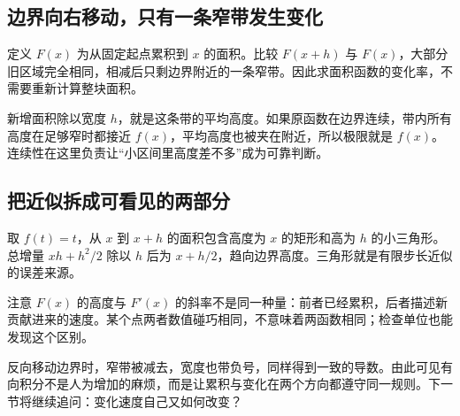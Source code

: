 \subsection*{边界向右移动，只有一条窄带发生变化}
定义 $F(x)$ 为从固定起点累积到 $x$ 的面积。比较 $F(x+h)$ 与 $F(x)$，大部分旧区域完全相同，相减后只剩边界附近的一条窄带。因此求面积函数的变化率，不需要重新计算整块面积。

新增面积除以宽度 $h$，就是这条带的平均高度。如果原函数在边界连续，带内所有高度在足够窄时都接近 $f(x)$，平均高度也被夹在附近，所以极限就是 $f(x)$。连续性在这里负责让“小区间里高度差不多”成为可靠判断。

\subsection*{把近似拆成可看见的两部分}
取 $f(t)=t$，从 $x$ 到 $x+h$ 的面积包含高度为 $x$ 的矩形和高为 $h$ 的小三角形。总增量 $xh+h^2/2$ 除以 $h$ 后为 $x+h/2$，趋向边界高度。三角形就是有限步长近似的误差来源。

注意 $F(x)$ 的高度与 $F'(x)$ 的斜率不是同一种量：前者已经累积，后者描述新贡献进来的速度。某个点两者数值碰巧相同，不意味着两函数相同；检查单位也能发现这个区别。

反向移动边界时，窄带被减去，宽度也带负号，同样得到一致的导数。由此可见有向积分不是人为增加的麻烦，而是让累积与变化在两个方向都遵守同一规则。下一节将继续追问：变化速度自己又如何改变？
